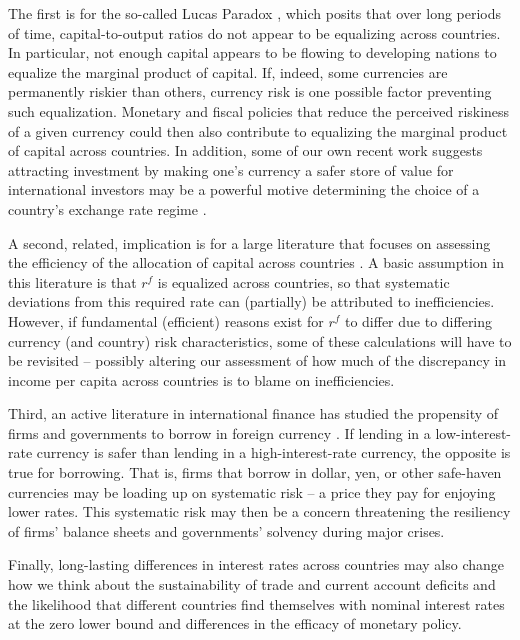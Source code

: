 \documentclass{ar-1col}
\begin{document}
The first is for the so-called Lucas Paradox \citep{Lucas1990}, which posits that over long periods of time, capital-to-output ratios do not appear to be equalizing across countries. In particular, not enough capital appears to be flowing to developing nations to equalize the marginal product of capital. If, indeed, some currencies are permanently riskier than others, currency risk is one possible factor preventing such equalization. Monetary and fiscal policies that reduce the perceived riskiness of a given currency could then also contribute to equalizing the marginal product of capital across countries. In addition, some of our own recent work suggests attracting investment by making one's currency a safer store of value for international investors may be a powerful motive determining the choice of a country's exchange rate regime \citep{HassanMertensZhang2020}.

A second, related, implication is for a large literature that focuses on assessing the efficiency of the allocation of capital across countries \citep{HallJones1997, CaselliFeyrer2007}. A basic assumption in this literature is that $r^f$ is equalized across countries, so that systematic deviations from this required rate can (partially) be attributed to inefficiencies. However, if fundamental (efficient) reasons exist for $r^f$ to differ due to differing currency (and country) risk characteristics, some of these calculations will have to be revisited -- possibly altering our assessment of how much of the discrepancy in income per capita across countries is to blame on inefficiencies.

Third, an active literature in international finance has studied the propensity of firms and governments to borrow in foreign currency \citep{cespedes2004balance, du2016sovereign}. If lending in a low-interest-rate currency is safer than lending in a high-interest-rate currency, the opposite is true for borrowing. That is, firms that borrow in dollar, yen, or other safe-haven currencies may be loading up on systematic risk -- a price they pay for enjoying lower rates. This systematic risk may then be a concern threatening the resiliency of firms' balance sheets and governments' solvency during major crises.

Finally, long-lasting differences in interest rates across countries may also change how we think about the sustainability of trade and current account deficits \citep{GourinchasRey2007} and the likelihood that different countries find themselves with nominal interest rates at the zero lower bound and differences in the efficacy of monetary policy.
\end{document}
